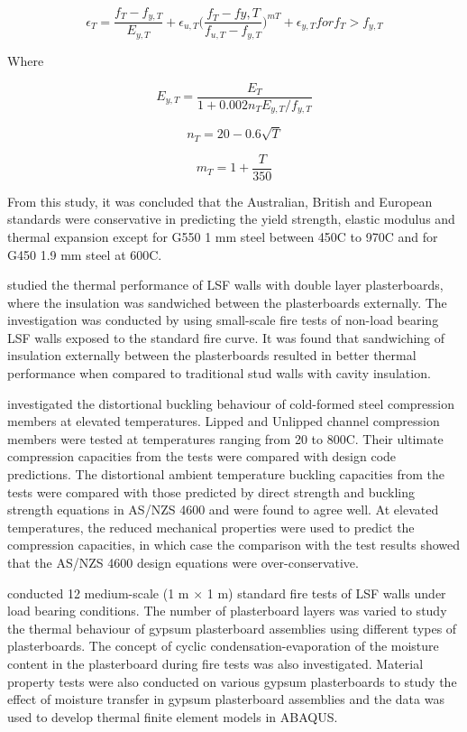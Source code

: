 \begin{equation}
\epsilon_T = \dfrac{f_T-f_{y,T}}{E_{y,T}}+\epsilon_{u,T}\big(\dfrac{f_T-f{y,T}}{f_{u,T}-f_{y,T}}\big)^{mT} + \epsilon_{y,T} for f_T > f_{y,T}
\end{equation}

Where

\begin{equation}
E_{y,T} = \dfrac{E_T}{1+0.002n_TE_{y,T}/f_{y,T}}
\end{equation}

\begin{equation}
n_T = 20-0.6\sqrt{T}
\end{equation}

\begin{equation}
m_T = 1+\dfrac{T}{350}
\end{equation}


From this study, it was concluded that the Australian, British and European standards were conservative in predicting the yield strength, elastic modulus and thermal expansion except for G550 1 mm steel between 450\degree C to 970\degree C and for G450 1.9 mm steel at 600\degree C. 

\citet{Kolarkar2008} studied the thermal performance of LSF walls with double layer plasterboards, where the insulation was sandwiched between the plasterboards externally. The investigation was conducted by using small-scale fire tests of non-load bearing LSF walls exposed to the standard fire curve. It was found that sandwiching of insulation externally between the plasterboards resulted in better thermal performance when compared to traditional stud walls with cavity insulation. 

\citet{Ranawaka2009} investigated the distortional buckling behaviour of cold-formed steel compression members at elevated temperatures. Lipped and Unlipped channel compression members were tested at temperatures ranging from 20 to 800\degree C. Their ultimate compression capacities from the tests were compared with design code predictions. The distortional ambient temperature buckling capacities from the tests were compared with those predicted by direct strength and buckling strength equations in AS/NZS 4600 and were found to agree well. At elevated temperatures, the reduced mechanical properties were used to predict the compression capacities, in which case the comparison with the test results showed that the AS/NZS 4600 design equations were over-conservative.

\citet{Rahmanian2011} conducted 12 medium-scale (1 m $\times$ 1 m) standard fire tests of LSF walls under load bearing conditions. The number of plasterboard layers was varied to study the thermal behaviour of gypsum plasterboard assemblies using different types of plasterboards. The concept of cyclic condensation-evaporation of the moisture content in the plasterboard during fire tests was also investigated. Material property tests were also conducted on various gypsum plasterboards to study the effect of moisture transfer in gypsum plasterboard assemblies and the data was used to develop thermal finite element models in ABAQUS. 

